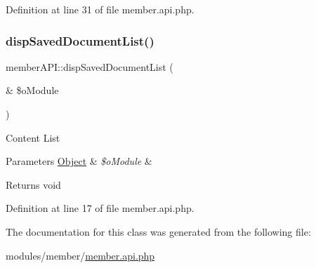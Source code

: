 Definition at line 31 of file member.\+api.\+php.

\hypertarget{classmemberAPI_ab5fd91bb448c7ba48304a12965b81a54}{}\label{classmemberAPI_ab5fd91bb448c7ba48304a12965b81a54} 
\subsubsection{\texorpdfstring{disp\+Saved\+Document\+List()}{dispSavedDocumentList()}}
{\footnotesize\ttfamily member\+A\+P\+I\+::disp\+Saved\+Document\+List (\begin{DoxyParamCaption}\item[{\&}]{\$o\+Module }\end{DoxyParamCaption})}

Content List


\begin{DoxyParams}[1]{Parameters}
\hyperlink{classObject}{Object} & {\em \$o\+Module} & \\
\hline
\end{DoxyParams}
\begin{DoxyReturn}{Returns}
void 
\end{DoxyReturn}


Definition at line 17 of file member.\+api.\+php.



The documentation for this class was generated from the following file\+:\begin{DoxyCompactItemize}
\item 
modules/member/\hyperlink{member_8api_8php}{member.\+api.\+php}\end{DoxyCompactItemize}

